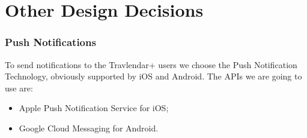 \begin{center}
\end{center}
%
%
\section{Other Design Decisions}

\subsubsection{Push Notifications}
To send notifications to the Travlendar+ users we choose the Push Notification Technology, obviously supported by iOS and Android.
The APIs we are going to use are:
\begin{itemize}
\item	Apple Push Notification Service for iOS;
\item	Google Cloud Messaging for Android.
\end{itemize}
%
%
